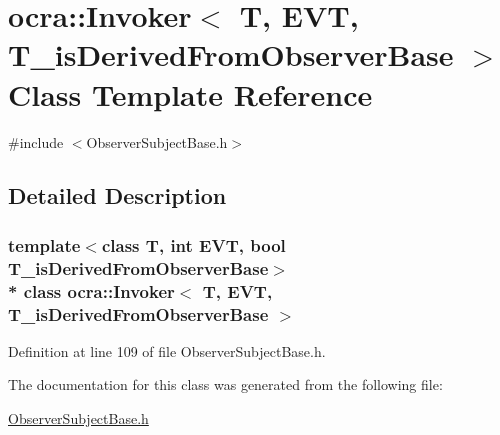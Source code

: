 \hypertarget{classocra_1_1Invoker}{}\section{ocra\+:\+:Invoker$<$ T, E\+VT, T\+\_\+is\+Derived\+From\+Observer\+Base $>$ Class Template Reference}
\label{classocra_1_1Invoker}


{\ttfamily \#include $<$Observer\+Subject\+Base.\+h$>$}



\subsection{Detailed Description}
\subsubsection*{template$<$class T, int E\+VT, bool T\+\_\+is\+Derived\+From\+Observer\+Base$>$\\*
class ocra\+::\+Invoker$<$ T, E\+V\+T, T\+\_\+is\+Derived\+From\+Observer\+Base $>$}



Definition at line 109 of file Observer\+Subject\+Base.\+h.



The documentation for this class was generated from the following file\+:\begin{DoxyCompactItemize}
\item 
\hyperlink{ObserverSubjectBase_8h}{Observer\+Subject\+Base.\+h}\end{DoxyCompactItemize}
